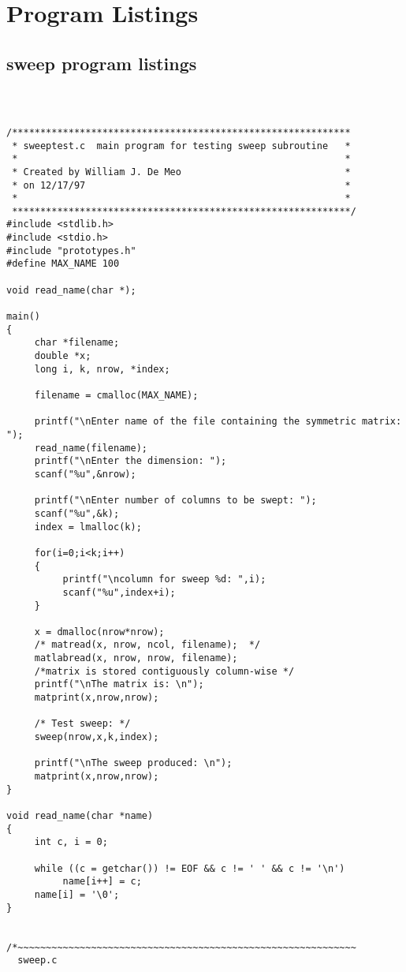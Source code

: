 \documentclass{article}
\begin{document}
\section{Program Listings}
\subsection{sweep program listings}
{\tt
\begin{verbatim}

/************************************************************
 * sweeptest.c  main program for testing sweep subroutine   *
 *                                                          *
 * Created by William J. De Meo                             *
 * on 12/17/97                                              *
 *                                                          *
 ************************************************************/
#include <stdlib.h>
#include <stdio.h>
#include "prototypes.h"
#define MAX_NAME 100

void read_name(char *);

main()
{
     char *filename;
     double *x;
     long i, k, nrow, *index;

     filename = cmalloc(MAX_NAME);

     printf("\nEnter name of the file containing the symmetric matrix: ");
     read_name(filename);
     printf("\nEnter the dimension: ");
     scanf("%u",&nrow);
     
     printf("\nEnter number of columns to be swept: ");
     scanf("%u",&k);
     index = lmalloc(k);

     for(i=0;i<k;i++)
     {
          printf("\ncolumn for sweep %d: ",i);
          scanf("%u",index+i);
     }

     x = dmalloc(nrow*nrow);
     /* matread(x, nrow, ncol, filename);  */
     matlabread(x, nrow, nrow, filename); 
     /*matrix is stored contiguously column-wise */
     printf("\nThe matrix is: \n");
     matprint(x,nrow,nrow);
     
     /* Test sweep: */
     sweep(nrow,x,k,index);               

     printf("\nThe sweep produced: \n");
     matprint(x,nrow,nrow);
}
  
void read_name(char *name)
{
     int c, i = 0;
  
     while ((c = getchar()) != EOF && c != ' ' && c != '\n')
          name[i++] = c;
     name[i] = '\0';
}


/*~~~~~~~~~~~~~~~~~~~~~~~~~~~~~~~~~~~~~~~~~~~~~~~~~~~~~~~~~~~~
  sweep.c


\end{verbatim}}
\end{document}
